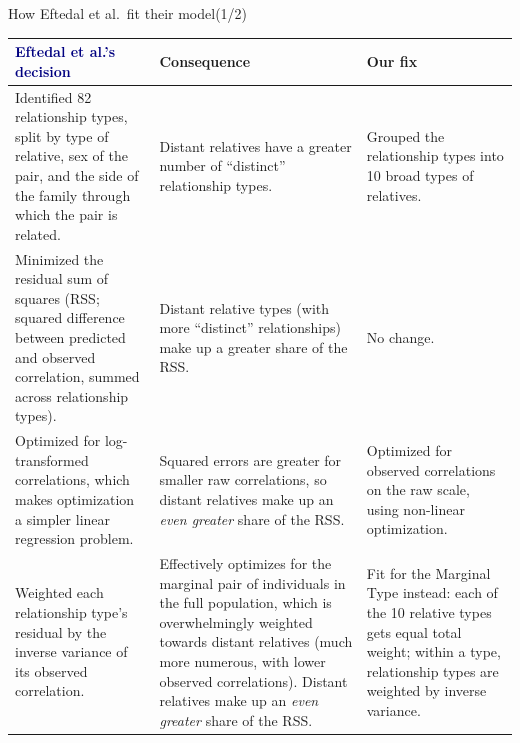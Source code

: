 \documentclass[aspectratio=169, 10pt]{beamer}
\makeatletter
\newenvironment{fittable}{%
  \scriptsize\renewcommand{\arraystretch}{1.25}%
  \begin{tabular}{@{}>{\raggedright\arraybackslash}p{0.32\textwidth}
                    >{\raggedright\arraybackslash}p{0.30\textwidth}
                    >{\raggedright\arraybackslash}p{0.315\textwidth}@{}}
  \toprule
  \textcolor{navy}{\textbf{Eftedal et al.'s decision}} & \textcolor{salmon!80!black}{\textbf{Consequence}}
  & \textcolor{teal!80!black}{\textbf{Our fix}} \\
  \midrule}{%
  \bottomrule\end{tabular}}
\newcommand{\rowgap}{\addlinespace[0.35em]}
\makeatother
\begin{document}
\begin{frame}{How Eftedal et al.\ fit their model}{(1/2)}
  \begin{fittable}
  Identified 82 relationship types, split by type of relative, sex of the pair, and the side of the
  family through which the pair is related.
  & Distant relatives have a greater number of ``distinct'' relationship types.
  & Grouped the relationship types into 10 broad types of relatives. \\ \rowgap
  Minimized the residual sum of squares (RSS; squared difference between predicted and observed
  correlation, summed across relationship types).
  & Distant relative types (with more ``distinct'' relationships) make up a greater share of the RSS.
  & No change. \\ \rowgap
  Optimized for log-transformed correlations, which makes optimization a simpler linear regression
  problem.
  & Squared errors are greater for smaller raw correlations, so distant relatives make up an
  \emph{even greater} share of the RSS.
  & Optimized for observed correlations on the raw scale, using non-linear optimization. \\ \rowgap
  Weighted each relationship type's residual by the inverse variance of its observed correlation.
  & Effectively optimizes for the marginal pair of individuals in the full population, which is
  overwhelmingly weighted towards distant relatives (much more numerous, with lower observed
  correlations). Distant relatives make up an \emph{even greater} share of the RSS.
  & Fit for the Marginal Type instead: each of the 10 relative types gets equal total weight; within a
  type, relationship types are weighted by inverse variance. \\
  \end{fittable}
\end{frame}
\end{document}

